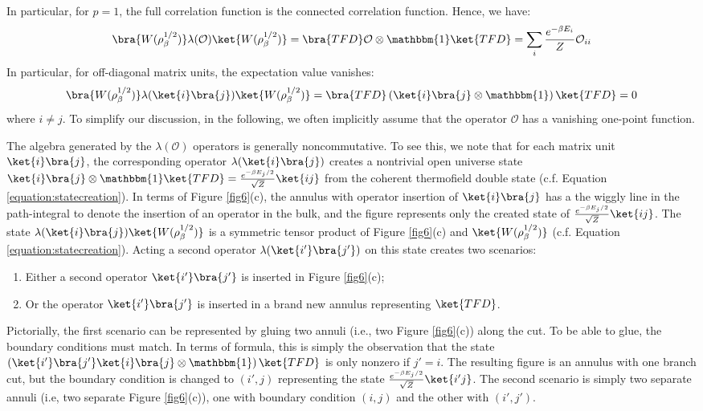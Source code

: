 \documentclass[a4paper,11pt]{article}
\theoremstyle{definition}
\numberwithin{equation}{section}
\newcommand{\lb}{\left(}
\newcommand{\rb}{\right)}
\begin{document}
In particular, for $p = 1$, the full correlation function is the connected correlation function. Hence, we have:
\begin{equation}
    \bra{W(\rho_\beta^{1/2})}\lambda(\mathcal{O})\ket{W(\rho_\beta^{1/2})} = \bra{TFD}\mathcal{O}\otimes\mathbbm{1}\ket{TFD} = \sum_i \frac{e^{-\beta E_i}}{Z}\mathcal{O}_{ii}
\end{equation}
In particular, for off-diagonal matrix units, the expectation value vanishes:
\begin{equation}
    \bra{W(\rho_\beta^{1/2})}\lambda(\ket{i}\bra{j})\ket{W(\rho_\beta^{1/2})} = \bra{TFD}\lb\ket{i}\bra{j}\otimes\mathbbm{1}\rb\ket{TFD} = 0
\end{equation}
where $i\neq j$. To simplify our discussion, in the following, we often implicitly assume that the operator $\mathcal{O}$ has a vanishing one-point function.

The algebra generated by the $\lambda(\mathcal{O})$ operators is generally noncommutative. To see this, we note that for each matrix unit $\ket{i}\bra{j}$, the corresponding operator $\lambda(\ket{i}\bra{j})$ creates a nontrivial open universe state $\ket{i}\bra{j}\otimes\mathbbm{1}\ket{TFD} = \frac{e^{-\beta E_j/2}}{\sqrt{Z}}\ket{ij}$ from the coherent thermofield double state (c.f. Equation \ref{equation:statecreation}). In terms of Figure \ref{fig6}(c), the annulus with operator insertion of $\ket{i}\bra{j}$ has a the wiggly line in the path-integral to denote the insertion of an operator in the bulk, and the figure represents only the created state of $\frac{e^{-\beta E_j/2}}{\sqrt{Z}}\ket{ij}$. The state $\lambda(\ket{i}\bra{j})\ket{W(\rho_\beta^{1/2})}$ is a symmetric tensor product of Figure \ref{fig6}(c) and $\ket{W(\rho_\beta^{1/2})}$ (c.f. Equation \ref{equation:statecreation}).
Acting a second operator $\lambda(\ket{i'}\bra{j'})$ on this state creates two scenarios:
\begin{enumerate}
    \item Either a second operator $\ket{i'}\bra{j'}$ is inserted in Figure \ref{fig6}(c); 
    \item Or the operator $\ket{i'}\bra{j'}$ is inserted in a brand new annulus representing $\ket{TFD}$.
\end{enumerate}
Pictorially, the first scenario can be represented by gluing two annuli (i.e., two Figure \ref{fig6}(c)) along the cut. To be able to glue, the boundary conditions must match. In terms of formula, this is simply the observation that the state $\lb\ket{i'}\bra{j'}\ket{i}\bra{j}\otimes\mathbbm{1}\rb\ket{TFD}$ is only nonzero if $j' = i$. The resulting figure is an annulus with one branch cut, but the boundary condition is changed to $(i',j)$ representing the state $\frac{e^{-\beta E_j/2}}{\sqrt{Z}}\ket{i'j}$. The second scenario is simply two separate annuli (i.e, two separate Figure \ref{fig6}(c)), one with boundary condition $(i,j)$ and the other with $(i',j')$.
\end{document}

